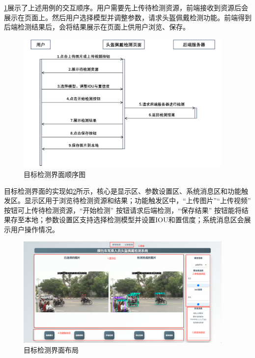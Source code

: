 \ref{fig:seq1}展示了上述用例的交互顺序。用户需要先上传待检测资源，前端接收到资源后会展示在页面上。然后用户选择模型并调整参数，请求头盔佩戴检测功能。前端得到后端检测结果后，会将结果展示在页面上供用户浏览、保存。
\begin{figure}[!htb]
    \centering
    \includegraphics[width=0.95\textwidth]{figs/chap05/seq1.png}
    \caption{目标检测界面顺序图}
    \label{fig:seq1}
\end{figure}

目标检测界面的实现如\ref{fig:detAll}所示，核心是显示区、参数设置区、系统消息区和功能触发区。显示区用于浏览待检测资源和结果；功能触发区中，“上传图片”“上传视频” 按钮可上传待检测资源，“开始检测” 按钮请求后端检测，“保存结果” 按钮能将结果存至本地；参数设置区支持选择检测模型并设置IOU和置信度；系统消息区会展示用户操作情况。

\begin{figure}[H]
    \centering
    \includegraphics[width=0.95\textwidth]{figs/chap05/detAll.png}
    \caption{目标检测界面布局}
    \label{fig:detAll}
\end{figure}


